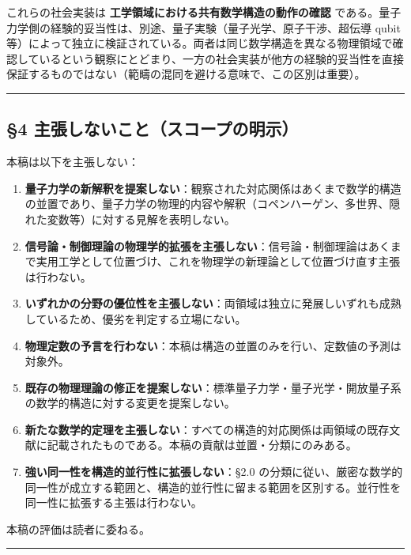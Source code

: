 \documentclass[
]{ltjsarticle}
\providecommand{\tightlist}{%
  \setlength{\itemsep}{0pt}\setlength{\parskip}{0pt}}
\begin{document}
これらの社会実装は \textbf{工学領域における共有数学構造の動作の確認}
である。量子力学側の経験的妥当性は、別途、量子実験（量子光学、原子干渉、超伝導
qubit
等）によって独立に検証されている。両者は同じ数学構造を異なる物理領域で確認しているという観察にとどまり、一方の社会実装が他方の経験的妥当性を直接保証するものではない（範疇の混同を避ける意味で、この区別は重要）。

\begin{center}\rule{0.5\linewidth}{0.5pt}\end{center}

\subsection{§4
主張しないこと（スコープの明示）}\label{ux4e3bux5f35ux3057ux306aux3044ux3053ux3068ux30b9ux30b3ux30fcux30d7ux306eux660eux793a}

本稿は以下を主張しない：

\begin{enumerate}
\def\labelenumi{\arabic{enumi}.}
\tightlist
\item
  \textbf{量子力学の新解釈を提案しない}：観察された対応関係はあくまで数学的構造の並置であり、量子力学の物理的内容や解釈（コペンハーゲン、多世界、隠れた変数等）に対する見解を表明しない。
\item
  \textbf{信号論・制御理論の物理学的拡張を主張しない}：信号論・制御理論はあくまで実用工学として位置づけ、これを物理学の新理論として位置づけ直す主張は行わない。
\item
  \textbf{いずれかの分野の優位性を主張しない}：両領域は独立に発展しいずれも成熟しているため、優劣を判定する立場にない。
\item
  \textbf{物理定数の予言を行わない}：本稿は構造の並置のみを行い、定数値の予測は対象外。
\item
  \textbf{既存の物理理論の修正を提案しない}：標準量子力学・量子光学・開放量子系の数学的構造に対する変更を提案しない。
\item
  \textbf{新たな数学的定理を主張しない}：すべての構造的対応関係は両領域の既存文献に記載されたものである。本稿の貢献は並置・分類にのみある。
\item
  \textbf{強い同一性を構造的並行性に拡張しない}：§2.0
  の分類に従い、厳密な数学的同一性が成立する範囲と、構造的並行性に留まる範囲を区別する。並行性を同一性に拡張する主張は行わない。
\end{enumerate}

本稿の評価は読者に委ねる。

\begin{center}\rule{0.5\linewidth}{0.5pt}\end{center}
\end{document}
